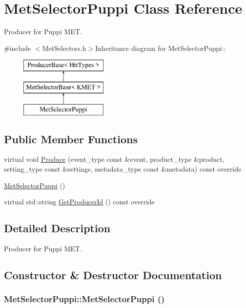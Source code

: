 \hypertarget{classMetSelectorPuppi}{
\section{MetSelectorPuppi Class Reference}
\label{classMetSelectorPuppi}
}


Producer for Puppi MET.  


{\ttfamily \#include $<$MetSelectors.h$>$}Inheritance diagram for MetSelectorPuppi::\begin{figure}[H]
\begin{center}
\leavevmode
\includegraphics[height=3cm]{classMetSelectorPuppi}
\end{center}
\end{figure}
\subsection*{Public Member Functions}
\begin{DoxyCompactItemize}
\item 
virtual void \hyperlink{classMetSelectorPuppi_a8271850e0ac5dfdfe20e403947f87c3d}{Produce} (event\_\-type const \&event, product\_\-type \&product, setting\_\-type const \&settings, metadata\_\-type const \&metadata) const override
\item 
\hyperlink{classMetSelectorPuppi_a4c6a498672c41d74319028da55481814}{MetSelectorPuppi} ()
\item 
virtual std::string \hyperlink{classMetSelectorPuppi_a3cd83a59f2fd82c5053e46ab1901bcee}{GetProducerId} () const override
\end{DoxyCompactItemize}


\subsection{Detailed Description}
Producer for Puppi MET. 

\subsection{Constructor \& Destructor Documentation}
\hypertarget{classMetSelectorPuppi_a4c6a498672c41d74319028da55481814}{
\subsubsection[{MetSelectorPuppi}]{\setlength{\rightskip}{0pt plus 5cm}MetSelectorPuppi::MetSelectorPuppi ()}}
\label{classMetSelectorPuppi_a4c6a498672c41d74319028da55481814}


